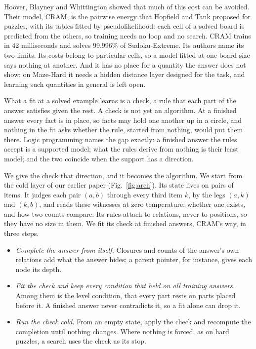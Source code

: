 \documentclass[10pt]{article}
\begin{document}
Hoover, Blayney and Whittington showed that much of this cost can be avoided\cite{hoover2026classical}. Their model,
CRAM, is the pairwise energy that Hopfield and Tank proposed for puzzles\cite{hopfield1985neural}, with its tables fitted
by pseudolikelihood\cite{besag1975statistical}: each cell of a solved board is predicted from the others, so training
needs no loop and no search. CRAM trains in 42 milliseconds and solves 99.996\% of
Sudoku-Extreme. Its authors name its two limits. Its costs belong to particular cells, so a model fitted at one board
size says nothing at another. And it has no place for a quantity the answer does not show: on Maze-Hard it needs a
hidden distance layer designed for the task, and learning such quantities in general is left open.

What a fit at a solved example learns is a check, a rule that each part of the answer satisfies given the rest. A check
is not yet an algorithm. At a finished answer every fact is in place, so facts may hold one another up in a circle, and
nothing in the fit asks whether the rule, started from nothing, would put them there. Logic programming names the gap
exactly: a finished answer the rules accept is a supported model; what the rules derive from nothing is their least
model; and the two coincide when the support has a direction\cite{clark1978negation,fages1994consistency}.

We give the check that direction, and it becomes the algorithm. We start from the cold layer of our earlier
paper\cite{mohsenvand2026zero} (Fig.~\ref{fig:arch}). Its state lives on pairs of items. It judges each pair $(a,b)$ through every third item
$k$, by the legs $(a,k)$ and $(k,b)$, and reads these witnesses at zero temperature: whether one exists, and how two
counts compare. Its rules attach to relations, never to positions, so they have no size in them. We fit its check at
finished answers, CRAM's way, in three steps.
\begin{itemize}
\setlength{\itemsep}{0pt}
\item \emph{Complete the answer from itself.} Closures and counts of the answer's own relations add what the answer
hides; a parent pointer, for instance, gives each node its depth.
\item \emph{Fit the check and keep every condition that held on all training answers.} Among them is the level
condition, that every part rests on parts placed before it. A finished answer never contradicts it, so a fit alone can
drop it.
\item \emph{Run the check cold.} From an empty state, apply the check and recompute the completion until nothing changes.
Where nothing is forced, as on hard puzzles, a search uses the check as its stop.
\end{itemize}
\end{document}
